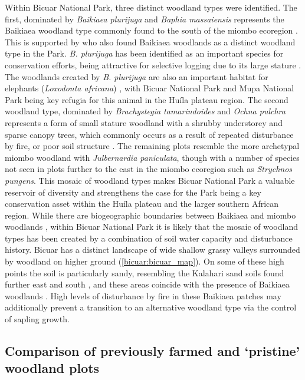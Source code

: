 \begin{refsection}
Within Bicuar National Park, three distinct woodland types were identified. The first, dominated by \textit{Baikiaea plurijuga} and \textit{Baphia massaiensis} represents the Baikiaea woodland type commonly found to the south of the miombo ecoregion \citep{Timberlake2010}. This is supported by \citet{Chisingui2018} who also found Baikiaea woodlands as a distinct woodland type in the Park. \textit{B. plurijuga} has been identified as an important species for conservation efforts, being attractive for selective logging due to its large stature \citep{Ngandwe2017, Wallenfang2015}. The woodlands created by \textit{B. plurijuga} are also an important habitat for elephants (\textit{Loxodonta africana}) \citep{Sianga2017, Mukwashi2012}, with Bicuar National Park and Mupa National Park being key refugia for this animal in the Hu\'{i}la plateau region. The second woodland type, dominated by \textit{Brachystegia tamarindoides} and \textit{Ochna pulchra} represents a form of small stature woodland with a shrubby understorey and sparse canopy trees, which commonly occurs as a result of repeated disturbance by fire, or poor soil structure \citep{Smith2004}. The remaining plots resemble the more archetypal miombo woodland with \textit{Julbernardia paniculata}, though with a number of species not seen in plots further to the east in the miombo ecoregion such as \textit{Strychnos pungens}. This mosaic of woodland types makes Bicuar National Park a valuable reservoir of diversity and strengthens the case for the Park being a key conservation asset within the Hu\'{i}la plateau and the larger southern African region. While there are biogeographic boundaries between Baikiaea and miombo woodlands \citep{White1983}, within Bicuar National Park it is likely that the mosaic of woodland types has been created by a combination of soil water capacity and disturbance history. Bicuar has a distinct landscape of wide shallow grassy valleys surrounded by woodland on higher ground (\autoref{bicuar:bicuar_map}). On some of these high points the soil is particularly sandy, resembling the Kalahari sand soils found further east and south \citep{Huntley2019}, and these areas coincide with the presence of Baikiaea woodlands \citep{Campbell2002}. High levels of disturbance by fire in these Baikiaea patches may additionally prevent a transition to an alternative woodland type via the control of sapling growth.

\subsection{Comparison of previously farmed and `pristine' woodland plots}
\label{bicuar:ssec:disturbance_discussion}


\end{refsection}
